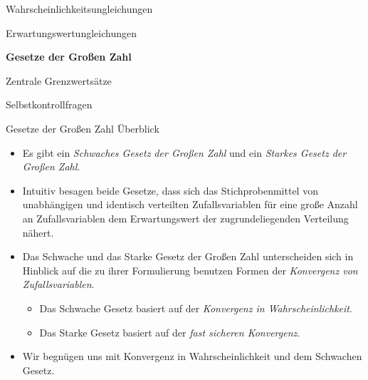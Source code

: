\documentclass[
  8pt,
  ignorenonframetext,
]{beamer}
\begin{document}
\begin{frame}{}
\protect\hypertarget{section-5}{}
\large
\vfill
{}

Wahrscheinlichkeitsungleichungen

Erwartungswertungleichungen

\textbf{Gesetze der Großen Zahl}

Zentrale Grenzwertsätze

Selbstkontrollfragen \vfill
\end{frame}

\begin{frame}{Gesetze der Großen Zahl}
\protect\hypertarget{gesetze-der-grouxdfen-zahl}{}
Überblick \vspace{2mm} \small

\begin{itemize}
\itemsep3mm
\justifying
\item Es gibt ein \textit{Schwaches Gesetz der Großen Zahl} und ein \textit{Starkes Gesetz der Großen Zahl}.
\item Intuitiv besagen beide Gesetze, dass sich das Stichprobenmittel von unabhängigen und identisch verteilten Zufallsvariablen für eine große Anzahl an Zufallsvariablen dem Erwartungswert  der zugrundeliegenden Verteilung nähert.
\item Das Schwache und das Starke Gesetz der Großen Zahl unterscheiden sich in Hinblick auf die zu ihrer Formulierung benutzen Formen der \textit{Konvergenz von Zufallsvariablen}.
\begin{itemize}
\small
\item Das Schwache Gesetz basiert auf der \textit{Konvergenz in Wahrscheinlichkeit}.
\item Das Starke Gesetz basiert auf der \textit{fast sicheren Konvergenz}.
\end{itemize}
\item Wir begnügen uns mit Konvergenz in Wahrscheinlichkeit und dem Schwachen Gesetz.
\end{itemize}
\end{frame}
\end{document}
